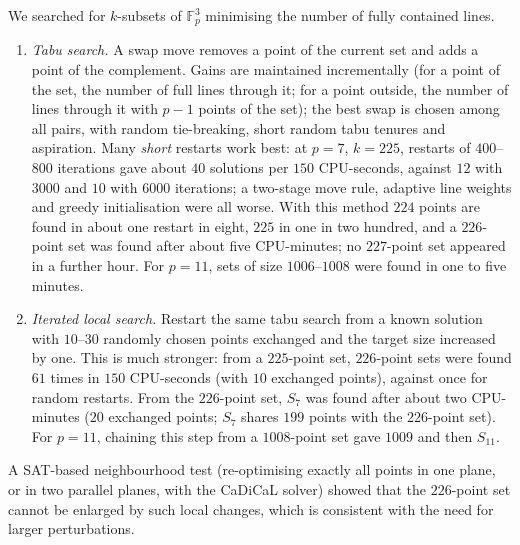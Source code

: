 \documentclass[11pt]{article}
\numberwithin{equation}{section}
\theoremstyle{definition}
\theoremstyle{remark}
\newcommand{\F}{\mathbb F}
\begin{document}
We searched for $k$-subsets of $\F_p^3$ minimising the number of fully contained lines.
\begin{enumerate}
\item \emph{Tabu search.} A swap move removes a point of the current set and adds a point of
the complement. Gains are maintained incrementally (for a point of the set, the number of full
lines through it; for a point outside, the number of lines through it with $p-1$ points of the
set); the best swap is chosen among all pairs, with random tie-breaking, short random tabu
tenures and aspiration. Many \emph{short} restarts work best: at $p=7$, $k=225$, restarts of
$400$--$800$ iterations gave about $40$ solutions per $150$ CPU-seconds, against $12$ with
$3000$ and $10$ with $6000$ iterations; a two-stage move rule, adaptive line weights and greedy
initialisation were all worse. With this method $224$ points are found in about one restart
in eight, $225$ in one in two hundred, and a $226$-point set was found after about five CPU-minutes;
no $227$-point set appeared in a further hour. For $p=11$, sets of size $1006$--$1008$ were found in
one to five minutes.
\item \emph{Iterated local search.} Restart the same tabu search from a known solution with
$10$--$30$ randomly chosen points exchanged and the target size increased by one. This is much
stronger: from a $225$-point set, $226$-point sets were found $61$ times in $150$ CPU-seconds
(with $10$ exchanged points), against once for random restarts. From the $226$-point set,
$S_7$ was found after about two CPU-minutes ($20$ exchanged points; $S_7$ shares $199$ points
with the $226$-point set). For $p=11$, chaining this step from a $1008$-point set gave
$1009$ and then $S_{11}$.
\end{enumerate}
A SAT-based neighbourhood test (re-optimising exactly all points in one plane, or in two parallel
planes, with the CaDiCaL solver) showed that the $226$-point set cannot be enlarged by such local
changes, which is consistent with the need for larger perturbations.
\end{document}
